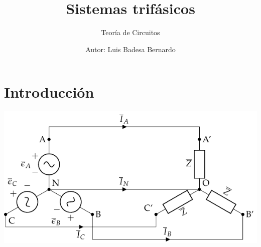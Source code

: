 \documentclass[aspectratio=169, usenames,svgnames,dvipsnames]{beamer}
\author{Autor: \hspace{2mm} Luis Badesa Bernardo}
\date{}
\title{Sistemas trifásicos \vspace{3mm}}
\subtitle{Teoría de Circuitos}
\begin{document}
\maketitle

\section{Introducción}

\begin{frame}{}
    \begin{center}
        \includegraphics[width=.9\linewidth]{../figs/EstrellaEquilibrado.pdf}
    \end{center}
\end{frame}

\end{document}
